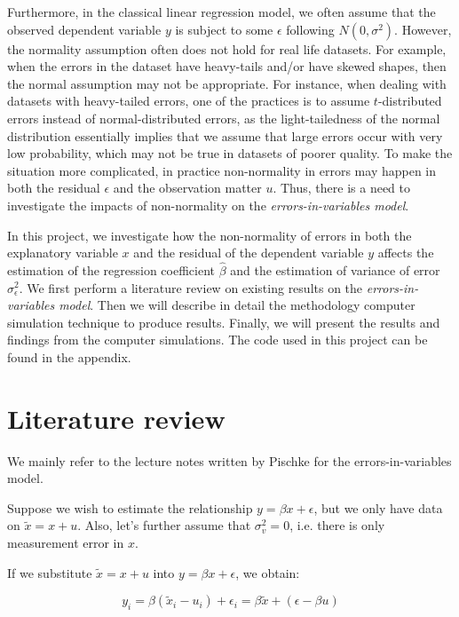 \documentclass{article}
\begin{document}
Furthermore, in the classical linear regression model, we often assume that the observed dependent variable $y$ is subject to some $\epsilon$ following $N(0, \sigma^2)$.
However, the normality assumption often does not hold for real life datasets.
For example, when the errors in the dataset have heavy-tails and/or have skewed shapes, then the normal assumption may not be appropriate.
For instance, when dealing with datasets with heavy-tailed errors, one of the practices is to assume $t$-distributed errors instead of normal-distributed errors,
as the light-tailedness of the normal distribution essentially implies that we assume that large errors occur with very low probability, which may not be true in datasets of poorer quality.
To make the situation more complicated, in practice non-normality in errors may happen in both the residual $\epsilon$ and the observation matter $u$.
Thus, there is a need to investigate the impacts of non-normality on the \textit{errors-in-variables model}. 

In this project, we investigate how the non-normality of errors in both the explanatory variable $x$ and the residual of the dependent variable $y$ affects the estimation of the regression coefficient $\hat{\beta}$ and the estimation of variance of error $\sigma^2_\epsilon$.
We first perform a literature review on existing results on the \textit{errors-in-variables model}.
Then we will describe in detail the methodology computer simulation technique to produce results.
Finally, we will present the results and findings from the computer simulations.
The code used in this project can be found in the appendix.

\section{Literature review}

We mainly refer to the lecture notes written by Pischke \cite{lecturenotes} for the errors-in-variables model. 

Suppose we wish to estimate the relationship $y = \beta x + \epsilon$, but we only have data on $\tilde{x} = x + u$. Also, let's further assume that $\sigma_v^2 = 0$, i.e. there is only measurement error in $x$.

If we substitute $\tilde{x} = x+u$ into $y = \beta x + \epsilon$, we obtain:

\begin{equation}
    y_i = \beta(\tilde{x}_i - u_i) + \epsilon_i = \beta \tilde{x} + (\epsilon - \beta u)
\end{equation}
\end{document}
